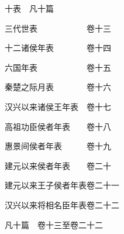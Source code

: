 \par\hspace{2em}十表　凡十篇
\par\hspace{2em}三代世表　　　　　　\hspace{1em}卷十三
\par\hspace{2em}十二诸侯年表　　　　\hspace{1em}卷十四
\par\hspace{2em}六国年表　　　　　　\hspace{1em}卷十五
\par\hspace{2em}秦楚之际月表　　　　\hspace{1em}卷十六
\par\hspace{2em}汉兴以来诸侯王年表　\hspace{1em}卷十七
\par\hspace{2em}高祖功臣侯者年表　　\hspace{1em}卷十八
\par\hspace{2em}惠景间侯者年表　　　\hspace{1em}卷十九
\par\hspace{2em}建元以来侯者年表　　\hspace{1em}卷二十
\par\hspace{2em}建元以来王子侯者年表\hspace{1em}卷二十一
\par\hspace{2em}汉兴以来将相名臣年表\hspace{1em}卷二十二
\par\hspace{2em}凡十篇　卷十三至卷二十二
